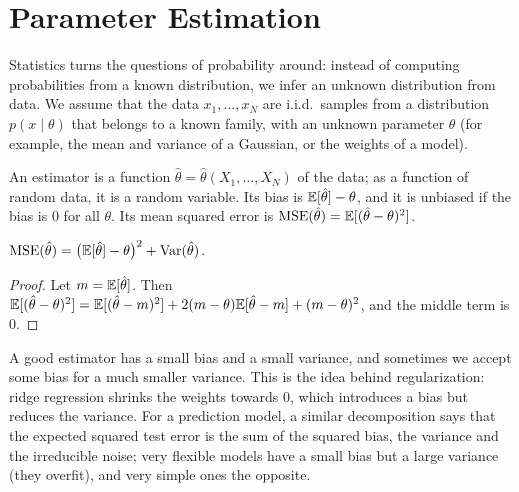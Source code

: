 \section{Parameter Estimation}\label{L4-sec:estimation}

Statistics turns the questions of probability around: instead of computing probabilities from a known distribution, we infer an unknown distribution from data. We assume that the data $x_1, \ldots, x_N$ are i.i.d.\ samples from a distribution $p(x \mid \theta)$ that belongs to a known family, with an unknown parameter $\theta$ (for example, the mean and variance of a Gaussian, or the weights of a model).

\begin{definition}\label{L4-def:estimator}
    An estimator is a function $\hat\theta = \hat\theta(X_1, \ldots, X_N)$ of the data; as a function of random data, it is a random variable. Its bias is $\mathbb{E}[\hat\theta] - \theta$, and it is unbiased if the bias is $0$ for all $\theta$. Its mean squared error is $\mathrm{MSE}(\hat\theta) = \mathbb{E}[(\hat\theta - \theta)^2]$.
\end{definition}

\begin{proposition}\label{L4-prop:bias-variance}
    $\mathrm{MSE}(\hat\theta) = \big(\mathbb{E}[\hat\theta] - \theta\big)^2 + \operatorname{Var}(\hat\theta)$.
\end{proposition}

\begin{proof}
    Let $m = \mathbb{E}[\hat\theta]$. Then $\mathbb{E}[(\hat\theta - \theta)^2] = \mathbb{E}[(\hat\theta - m)^2] + 2(m - \theta)\mathbb{E}[\hat\theta - m] + (m - \theta)^2$, and the middle term is $0$.
\end{proof}

A good estimator has a small bias and a small variance, and sometimes we accept some bias for a much smaller variance. This is the idea behind regularization: ridge regression shrinks the weights towards $0$, which introduces a bias but reduces the variance. For a prediction model, a similar decomposition says that the expected squared test error is the sum of the squared bias, the variance and the irreducible noise; very flexible models have a small bias but a large variance (they overfit), and very simple ones the opposite.

